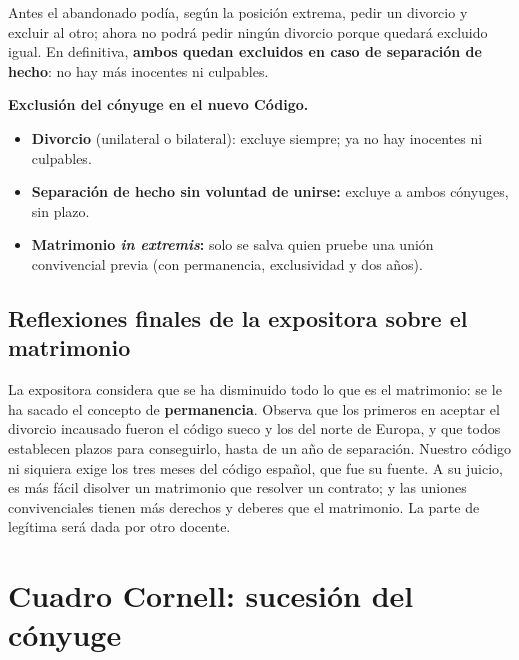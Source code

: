 \documentclass[12pt,oneside]{book}
\begin{document}
Antes el abandonado podía, según la posición extrema, pedir un divorcio y excluir al otro; ahora no podrá pedir ningún divorcio porque quedará excluido igual. En definitiva, \textbf{ambos quedan excluidos en caso de separación de hecho}: no hay más inocentes ni culpables.

\begin{important}
\textbf{Exclusión del cónyuge en el nuevo Código.}
\begin{itemize}
    \item \textbf{Divorcio} (unilateral o bilateral): excluye siempre; ya no hay inocentes ni culpables.
    \item \textbf{Separación de hecho sin voluntad de unirse:} excluye a ambos cónyuges, sin plazo.
    \item \textbf{Matrimonio \textit{in extremis}:} solo se salva quien pruebe una unión convivencial previa (con permanencia, exclusividad y dos años).
\end{itemize}
\end{important}

\subsection{Reflexiones finales de la expositora sobre el matrimonio}

La expositora considera que se ha disminuido todo lo que es el matrimonio: se le ha sacado el concepto de \textbf{permanencia}. Observa que los primeros en aceptar el divorcio incausado fueron el código sueco y los del norte de Europa, y que todos establecen plazos para conseguirlo, hasta de un año de separación. Nuestro código ni siquiera exige los tres meses del código español, que fue su fuente. A su juicio, es más fácil disolver un matrimonio que resolver un contrato; y las uniones convivenciales tienen más derechos y deberes que el matrimonio. La parte de legítima será dada por otro docente.

\section{Cuadro Cornell: sucesión del cónyuge}
\end{document}
